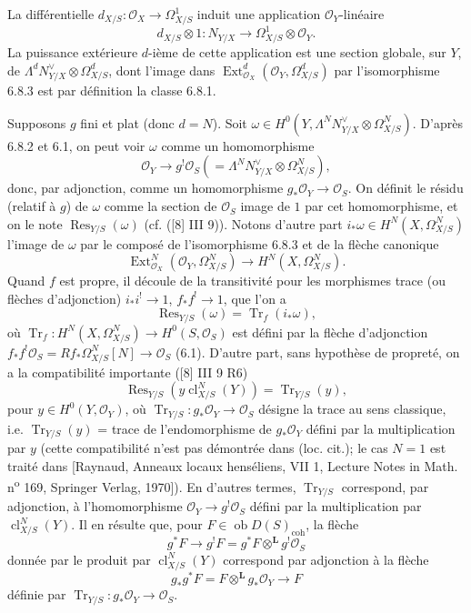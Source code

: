 \documentclass[11pt]{article}
\DeclareMathOperator{\Ext}{Ext}
\newcommand{\ob}{\operatorname{ob}}
\providecommand{\cl}{\operatorname{cl}}
\providecommand{\OO}{\mathcal{O}}
\providecommand{\LL}{\mathbf L}
\providecommand{\coh}{\mathrm{coh}}
\providecommand{\ob}{\operatorname{ob}}
\begin{document}
La différentielle $d_{X/S}:\OO_X\to\Omega^1_{X/S}$ induit une application $\OO_Y$-linéaire
\[
d_{X/S}\otimes 1:N_{Y/X}\longrightarrow \Omega^1_{X/S}\otimes\OO_Y.
\]
La puissance extérieure $d$-ième de cette application est une section globale, sur $Y$, de $\Lambda^d N_{Y/X}^{\vee}\otimes\Omega^d_{X/S}$, dont l'image dans $\Ext^d_{\OO_X}(\OO_Y,\Omega^d_{X/S})$ par l'isomorphisme 6.8.3 est par définition la classe 6.8.1.

Supposons $g$ fini et plat (donc $d=N$). Soit $\omega\in H^0(Y,\Lambda^N N_{Y/X}^{\vee}\otimes\Omega^N_{X/S})$. D'après 6.8.2 et 6.1, on peut voir $\omega$ comme un homomorphisme
\[
\OO_Y\longrightarrow g^!\OO_S(=\Lambda^N N_{Y/X}^{\vee}\otimes\Omega^N_{X/S}),
\]
donc, par adjonction, comme un homomorphisme $g_*\OO_Y\to\OO_S$. On définit le résidu (relatif à $g$) de $\omega$ comme la section de $\OO_S$ image de $1$ par cet homomorphisme, et on le note $\operatorname{Res}_{Y/S}(\omega)$ (cf. ([8] III 9)). Notons d'autre part $i_*\omega\in H^N(X,\Omega^N_{X/S})$ l'image de $\omega$ par le composé de l'isomorphisme 6.8.3 et de la flèche canonique
\[
\Ext^N_{\OO_X}(\OO_Y,\Omega^N_{X/S})\longrightarrow H^N(X,\Omega^N_{X/S}).
\]
Quand $f$ est propre, il découle de la transitivité pour les morphismes trace (ou flèches d'adjonction) $i_*i^!\to 1$, $f_*f^!\to 1$, que l'on a
\begin{equation}
\tag{6.8.4}
\operatorname{Res}_{Y/S}(\omega)=\operatorname{Tr}_f(i_*\omega),
\end{equation}
où $\operatorname{Tr}_f:H^N(X,\Omega^N_{X/S})\to H^0(S,\OO_S)$ est défini par la flèche d'adjonction $f_*f^!\OO_S=Rf_*\Omega^N_{X/S}[N]\to\OO_S$ (6.1). D'autre part, sans hypothèse de propreté, on a la compatibilité importante ([8] III 9 R6)
\begin{equation}
\tag{6.8.5}
\operatorname{Res}_{Y/S}(y\cl^N_{X/S}(Y))=\operatorname{Tr}_{Y/S}(y),
\end{equation}
pour $y\in H^0(Y,\OO_Y)$, où $\operatorname{Tr}_{Y/S}:g_*\OO_Y\to\OO_S$ désigne la trace au sens classique, i.e. $\operatorname{Tr}_{Y/S}(y)$ = trace de l'endomorphisme de $g_*\OO_Y$ défini par la multiplication par $y$ (cette compatibilité n'est pas démontrée dans (loc. cit.); le cas $N=1$ est traité dans [Raynaud, Anneaux locaux henséliens, VII 1, Lecture Notes in Math. n\textsuperscript{o} 169, Springer Verlag, 1970]). En d'autres termes, $\operatorname{Tr}_{Y/S}$ correspond, par adjonction, à l'homomorphisme $\OO_Y\to g^!\OO_S$ défini par la multiplication par $\cl^N_{X/S}(Y)$. Il en résulte que, pour $F\in\ob D(S)_{\coh}$, la flèche
\begin{equation}
\tag{6.8.6}
g^*F\longrightarrow g^!F=g^*F\otimes^{\LL}g^!\OO_S
\end{equation}
donnée par le produit par $\cl^N_{X/S}(Y)$ correspond par adjonction à la flèche
\begin{equation}
\tag{6.8.7}
g_*g^*F=F\otimes^{\LL}g_*\OO_Y\longrightarrow F
\end{equation}
définie par $\operatorname{Tr}_{Y/S}:g_*\OO_Y\to\OO_S$.
\end{document}
